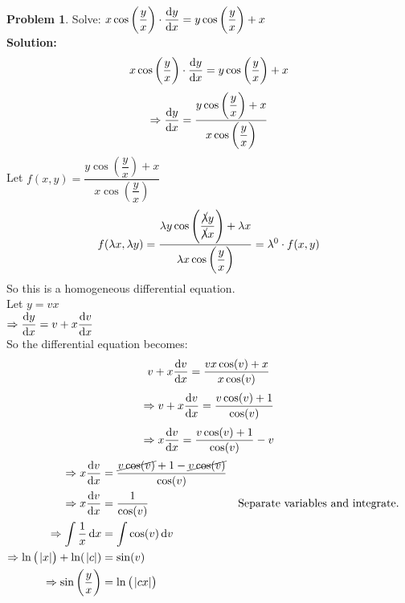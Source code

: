 \documentclass[14]{article}
\theoremstyle{definition}
\newtheorem{prob}{Problem}
\theoremstyle{case}
\begin{document}
\begin{prob}
Solve: $x \cos\left( \dfrac{y}{x}\right) \cdot \dfrac{\dif y}{\dif x} = y \cos\left(\dfrac{y}{x}\right) + x$\\
\textbf{Solution:}\\
\[x \cos\left( \dfrac{y}{x}\right) \cdot \dfrac{\dif y}{\dif x} = y \cos\left(\dfrac{y}{x}\right) + x\]
\[\Rightarrow \dfrac{\dif y}{\dif x} = \dfrac{y \cos\left(\dfrac{y}{x}\right) + x}{x \cos\left(\dfrac{y}{x}\right)}\]
Let $f(x, y) = \dfrac{y \cos\left(\dfrac{y}{x}\right) + x}{x \cos\left(\dfrac{y}{x}\right)}$
\[f(\lambda x, \lambda y) = \dfrac{\lambda y \cos\left(\dfrac{\cancel{\lambda} y}{\cancel{\lambda} x }\right) + \lambda x}{\lambda x \cos\left(\dfrac{y}{x}\right)} = \lambda^0 \cdot f(x, y)\]
So this is a homogeneous differential equation.\\
Let $y = vx$\\
$\Rightarrow \dfrac{\dif y}{\dif x} = v + x \dfrac{\dif v}{\dif x}$\\
So the differential equation becomes:
\[v + x \dfrac{\dif v}{\dif x} = \dfrac{vx \cos(v) + x}{x \cos(v)}\]
\[\Rightarrow v + x \dfrac{\dif v}{\dif x} = \dfrac{v \cos(v) + 1}{ \cos(v)}\]
\[\Rightarrow x\dfrac{\dif v}{\dif x} = \dfrac{v \cos(v) + 1}{ \cos(v)} - v\]
\begin{align*}
\Rightarrow x\dfrac{\dif v}{\dif x} &= \dfrac{\cancel{v \cos(v)} + 1 - \cancel{v \cos(v)}}{ \cos(v)}\\
\Rightarrow x\dfrac{\dif v}{\dif x} &= \dfrac1{\cos(v)} && \text{Separate variables and integrate.}\\
\Rightarrow \int\dfrac{1}{x} \dif x &= \int\cos(v) \dif v\\
\Rightarrow \ln\left(\;\abs{x}\right) + \ln(\;\abs{c}) &= \sin(v)\\
\Rightarrow \sin\left(\dfrac{y}{x}\right) &= \ln\left(\;\abs{cx}\right)
\end{align*}
\end{prob}
\end{document}
